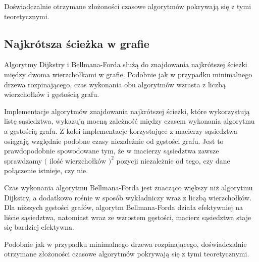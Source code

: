 \documentclass{article}
\begin{document}
        Doświadczalnie otrzymane złożoności czasowe algorytmów pokrywają się z tymi teoretycznymi.

    \subsection{Najkrótsza ścieżka w grafie}

        Algorytmy Dijkstry i Bellmana-Forda służą do znajdowania najkrótszej ścieżki między dwoma wierzchołkami w grafie. 
        Podobnie jak w przypadku minimalnego drzewa rozpinającego, czas wykonania obu algorytmów wzrasta z liczbą wierzchołków i gęstością grafu.

        Implementacje algorytmów znajdowania najkrótszej ścieżki, które wykorzystują listę sąsiedztwa, wykazują mocną zależność między czasem wykonania algorytmu
        a gęstością grafu. Z kolei implementacje korzystające z macierzy sąsiedztwa osiągają względnie podobne czasy niezależnie od gęstości grafu. Jest to 
        prawdopodobnie spowodowane tym, że w macierzy sąsiedztwa zawsze sprawdzamy $($ ilość wierzchołków $)^2$ pozycji niezależnie od tego, czy dane połączenie istnieje, czy nie.

        Czas wykonania algorytmu Bellmana-Forda jest znacząco większy niż algorytmu Dijkstry, a dodatkowo rośnie w sposób wykładniczy wraz z liczbą wierzchołków. 
        Dla niższych gęstości grafów, algorytm Bellmana-Forda działa efektywniej na liście sąsiedztwa, natomiast wraz ze wzrostem gęstości, 
        macierz sąsiedztwa staje się bardziej efektywna.

        Podobnie jak w przypadku minimalnego drzewa rozpinającego, doświadczalnie otrzymane złożoności czasowe algorytmów pokrywają się z tymi teoretycznymi.
\end{document}
